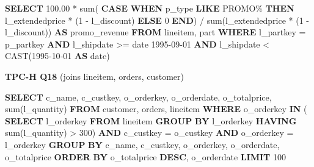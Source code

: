 \documentclass[
]{article}
\newenvironment{Shaded}{}{}
\newcommand{\ControlFlowTok}[1]{\textcolor[rgb]{0.00,0.44,0.13}{\textbf{#1}}}
\newcommand{\DataTypeTok}[1]{\textcolor[rgb]{0.56,0.13,0.00}{#1}}
\newcommand{\DecValTok}[1]{\textcolor[rgb]{0.25,0.63,0.44}{#1}}
\newcommand{\FloatTok}[1]{\textcolor[rgb]{0.25,0.63,0.44}{#1}}
\newcommand{\FunctionTok}[1]{\textcolor[rgb]{0.02,0.16,0.49}{#1}}
\newcommand{\KeywordTok}[1]{\textcolor[rgb]{0.00,0.44,0.13}{\textbf{#1}}}
\newcommand{\NormalTok}[1]{#1}
\newcommand{\OperatorTok}[1]{\textcolor[rgb]{0.40,0.40,0.40}{#1}}
\newcommand{\StringTok}[1]{\textcolor[rgb]{0.25,0.44,0.63}{#1}}
\begin{document}
\begin{Shaded}
\begin{Highlighting}[]
\KeywordTok{SELECT}
    \FloatTok{100.00} \OperatorTok{*} \FunctionTok{sum}\NormalTok{(}
        \ControlFlowTok{CASE} \ControlFlowTok{WHEN}\NormalTok{ p\_type }\KeywordTok{LIKE} \StringTok{\textquotesingle{}PROMO\%\textquotesingle{}} \ControlFlowTok{THEN}
\NormalTok{            l\_extendedprice }\OperatorTok{*}\NormalTok{ (}\DecValTok{1} \OperatorTok{{-}}\NormalTok{ l\_discount)}
        \ControlFlowTok{ELSE}
            \DecValTok{0}
        \ControlFlowTok{END}\NormalTok{) }\OperatorTok{/} \FunctionTok{sum}\NormalTok{(l\_extendedprice }\OperatorTok{*}\NormalTok{ (}\DecValTok{1} \OperatorTok{{-}}\NormalTok{ l\_discount)) }\KeywordTok{AS}\NormalTok{ promo\_revenue}
\KeywordTok{FROM}
\NormalTok{    lineitem,}
\NormalTok{    part}
\KeywordTok{WHERE}
\NormalTok{    l\_partkey }\OperatorTok{=}\NormalTok{ p\_partkey}
    \KeywordTok{AND}\NormalTok{ l\_shipdate }\OperatorTok{\textgreater{}=} \DataTypeTok{date} \StringTok{\textquotesingle{}1995{-}09{-}01\textquotesingle{}}
    \KeywordTok{AND}\NormalTok{ l\_shipdate }\OperatorTok{\textless{}} \FunctionTok{CAST}\NormalTok{(}\StringTok{\textquotesingle{}1995{-}10{-}01\textquotesingle{}} \KeywordTok{AS} \DataTypeTok{date}\NormalTok{)}
\end{Highlighting}
\end{Shaded}

\textbf{TPC-H Q18} (joins lineitem, orders, customer)

\begin{Shaded}
\begin{Highlighting}[]
\KeywordTok{SELECT}
\NormalTok{    c\_name,}
\NormalTok{    c\_custkey,}
\NormalTok{    o\_orderkey,}
\NormalTok{    o\_orderdate,}
\NormalTok{    o\_totalprice,}
    \FunctionTok{sum}\NormalTok{(l\_quantity)}
\KeywordTok{FROM}
\NormalTok{    customer,}
\NormalTok{    orders,}
\NormalTok{    lineitem}
\KeywordTok{WHERE}
\NormalTok{    o\_orderkey }\KeywordTok{IN}\NormalTok{ (}
        \KeywordTok{SELECT}
\NormalTok{            l\_orderkey}
        \KeywordTok{FROM}
\NormalTok{            lineitem}
        \KeywordTok{GROUP} \KeywordTok{BY}
\NormalTok{            l\_orderkey}
        \KeywordTok{HAVING}
            \FunctionTok{sum}\NormalTok{(l\_quantity) }\OperatorTok{\textgreater{}} \DecValTok{300}\NormalTok{)}
    \KeywordTok{AND}\NormalTok{ c\_custkey }\OperatorTok{=}\NormalTok{ o\_custkey}
    \KeywordTok{AND}\NormalTok{ o\_orderkey }\OperatorTok{=}\NormalTok{ l\_orderkey}
\KeywordTok{GROUP} \KeywordTok{BY}
\NormalTok{    c\_name,}
\NormalTok{    c\_custkey,}
\NormalTok{    o\_orderkey,}
\NormalTok{    o\_orderdate,}
\NormalTok{    o\_totalprice}
\KeywordTok{ORDER} \KeywordTok{BY}
\NormalTok{    o\_totalprice }\KeywordTok{DESC}\NormalTok{,}
\NormalTok{    o\_orderdate}
\KeywordTok{LIMIT} \DecValTok{100}
\end{Highlighting}
\end{Shaded}
\end{document}
